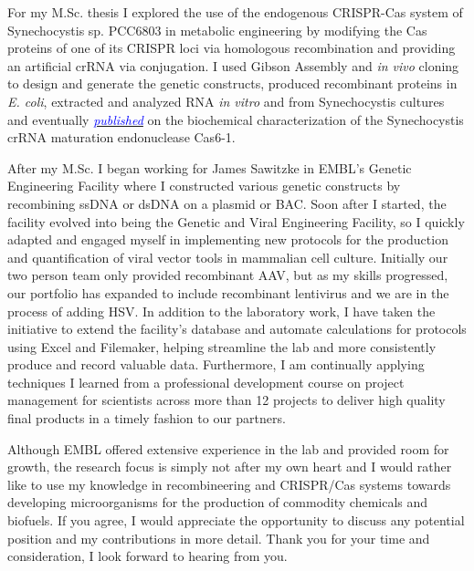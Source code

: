 \documentclass[11pt,a4paper,sans]{moderncv}
\begin{document}
\begin{spacing}{1.1}
For my M.Sc. thesis I explored the use of the endogenous CRISPR-Cas system of Synechocystis sp. PCC6803 in metabolic engineering by modifying the Cas proteins of one of its CRISPR loci via homologous recombination and providing an artificial crRNA via conjugation.%
I used Gibson Assembly and \textit{in vivo} cloning to design and generate the genetic constructs, produced recombinant proteins in \textit{E. coli}, extracted and analyzed RNA \textit{in vitro} and from Synechocystis cultures and eventually  {\href{https://www.tandfonline.com/eprint/vmAQ3vjYGdZIZpIKQTIT/full}{\textcolor{blue}{{\textit{published}}}}} on the biochemical characterization of the Synechocystis crRNA maturation endonuclease Cas6-1. %
\par\vspace*{3mm}
After my M.Sc. I began working for James Sawitzke in EMBL's Genetic Engineering Facility where I constructed various genetic constructs by recombining ssDNA or dsDNA on a plasmid or BAC.
Soon after I started, the facility evolved into being the Genetic and Viral Engineering Facility, so I quickly adapted and engaged myself in implementing new protocols for the production and quantification of viral vector tools in mammalian cell culture. 			
Initially our two person team only provided recombinant AAV, but as my skills progressed, our portfolio has expanded to include recombinant lentivirus and we are in the process of adding HSV.
In addition to the laboratory work, I have taken the initiative to extend the facility's database and automate calculations for protocols using Excel and Filemaker, helping streamline the lab and more consistently produce and record valuable data. 
Furthermore, I am continually applying techniques I learned from a professional development course on project management for scientists across more than 12 projects to deliver high quality final products in a timely fashion to our partners.\par\vspace*{3mm}

Although EMBL offered extensive experience in the lab and provided room for growth, the research focus is simply not after my own heart and I would rather like to use my knowledge in recombineering and CRISPR/Cas systems towards developing microorganisms for the production of commodity chemicals and biofuels.
If you agree, I would appreciate the opportunity to discuss any potential position and my contributions in more detail. 
Thank you for your time and consideration, I look forward to hearing from you.
 

 

\end{spacing}
\makeletterclosing
\end{document}
